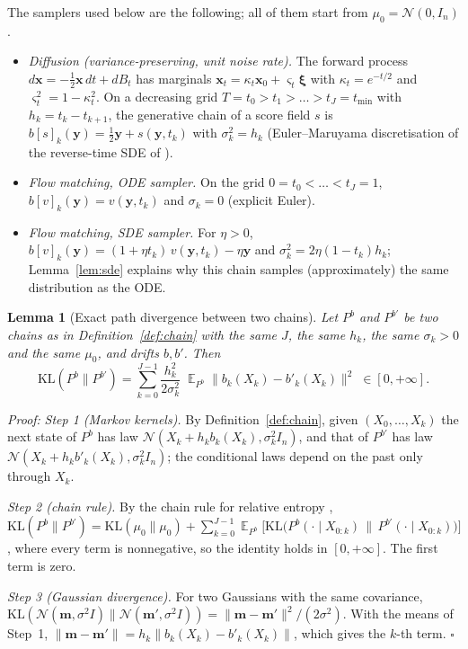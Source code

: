 \documentclass{article}
\DeclareMathOperator{\E}{\mathbb{E}}
\newcommand{\KL}{\mathrm{KL}}
\newcommand{\bx}{\mathbf{x}}
\newcommand{\by}{\mathbf{y}}
\newcommand{\bxi}{\boldsymbol{\xi}}
\theoremstyle{plain}
\newtheorem{lemma}{Lemma}
\begin{document}
The samplers used below are the following; all of them start from $\mu_0=\mathcal{N}(0,I_n)$.
\begin{itemize}
\item \emph{Diffusion (variance-preserving, unit noise rate).} The forward process
$d\bx=-\tfrac12\bx\,dt+dB_t$ has marginals $\bx_t=\kappa_t\bx_0+\varsigma_t\bxi$ with
$\kappa_t=e^{-t/2}$ and $\varsigma_t^2=1-\kappa_t^2$. On a decreasing grid
$T=t_0>t_1>\dots>t_J=t_{\min}$ with $h_k=t_k-t_{k+1}$, the generative chain of a score field
$s$ is $b[s]_k(\by)=\tfrac12\by+s(\by,t_k)$ with $\sigma_k^2=h_k$ (Euler--Maruyama
discretisation of the reverse-time SDE of \citet{song2021score}).
\item \emph{Flow matching, ODE sampler.} On the grid $0=t_0<\dots<t_J=1$,
$b[v]_k(\by)=v(\by,t_k)$ and $\sigma_k=0$ (explicit Euler).
\item \emph{Flow matching, SDE sampler.} For $\eta>0$, $b[v]_k(\by)=(1+\eta t_k)\,v(\by,t_k)-\eta\by$
and $\sigma_k^2=2\eta(1-t_k)h_k$; Lemma~\ref{lem:sde} explains why this chain samples
(approximately) the same distribution as the ODE.
\end{itemize}

\begin{lemma}[Exact path divergence between two chains]\label{lem:chain_kl}
Let $P^b$ and $P^{b'}$ be two chains as in Definition~\ref{def:chain} with the same $J$, the same
$h_k$, the same $\sigma_k>0$ and the same $\mu_0$, and drifts $b,b'$. Then
\[
  \KL(P^b\|P^{b'})=\sum_{k=0}^{J-1}\frac{h_k^2}{2\sigma_k^2}\;
  \E_{P^b}\big\|b_k(X_k)-b'_k(X_k)\big\|^2\;\in[0,+\infty].
\]
\end{lemma}
\textit{Proof:}
\emph{Step 1 (Markov kernels).} By Definition~\ref{def:chain}, given $(X_0,\dots,X_k)$ the
next state of $P^b$ has law $\mathcal{N}(X_k+h_kb_k(X_k),\sigma_k^2I_n)$, and that of $P^{b'}$
has law $\mathcal{N}(X_k+h_kb'_k(X_k),\sigma_k^2I_n)$; the conditional laws depend on the past
only through $X_k$.

\emph{Step 2 (chain rule).} By the chain rule for relative entropy
\citep[Thm.~2.5.3]{cover2006elements},
$\KL(P^b\|P^{b'})=\KL(\mu_0\|\mu_0)+\sum_{k=0}^{J-1}\E_{P^b}\big[\KL\big(P^b(\cdot\mid X_{0:k})\,\|\,P^{b'}(\cdot\mid X_{0:k})\big)\big]$,
where every term is nonnegative, so the identity holds in $[0,+\infty]$. The first term is zero.

\emph{Step 3 (Gaussian divergence).} For two Gaussians with the same covariance,
$\KL(\mathcal{N}(\mathbf{m},\sigma^2I)\|\mathcal{N}(\mathbf{m}',\sigma^2I))=\|\mathbf{m}-\mathbf{m}'\|^2/(2\sigma^2)$.
With the means of Step~1, $\|\mathbf{m}-\mathbf{m}'\|=h_k\|b_k(X_k)-b'_k(X_k)\|$, which gives the
$k$-th term. \hfill $\square$
\end{document}
